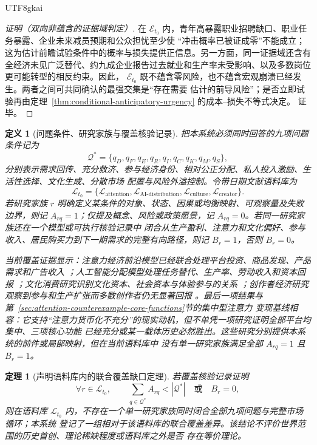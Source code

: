 \documentclass[12pt,a4paper,openany]{report}
\newtheorem{definition}{定义}[chapter]
\newtheorem{theorem}{定理}[chapter]
\begin{document}
\begin{CJK*}{UTF8}{gkai}
\begin{proof}[证明（双向非蕴含的证据域判定）]
在 \(\mathcal E_{t_0}\) 内，青年高暴露职业招聘缺口、职业任务暴露、企业未来减员预期和公众担忧至少使
“冲击概率已被证成零”不能成立；这为估计前瞻试验条件中的概率与损失提供正信息。另一方面，同一证据域还含有
全经济未见广泛替代、约九成企业报告过去就业和生产率未受影响、以及多数岗位更可能转型的相反约束。因此，
\(\mathcal E_{t_0}\) 既不蕴含零风险，也不蕴含宏观崩溃已经发生。两者之间可共同确认的最强交集是“存在需要
估计的前导风险”；是否立即试验再由定理~\ref{thm:conditional-anticipatory-urgency} 的成本--损失不等式决定。
证毕。
\end{proof}

\begin{definition}[问题条件、研究家族与覆盖核验记录]
\label{def:research-problem-gates}
把本系统必须同时回答的九项问题条件记为
\[
  \mathcal Q^*
  =\{q_D,q_F,q_E,q_R,q_I,q_C,q_K,q_M,q_S\},
\]
分别表示需求回传、充分救济、参与经济身份、相对公正分配、私人投入激励、生活性选择、文化生成、分散市场
配置与风险外溢控制。令带日期文献语料库为
\[
  \mathcal L_{t_0}
  =\{
  \mathcal L_{\mathrm{attention}},
  \mathcal L_{\mathrm{AI\text{-}distribution}},
  \mathcal L_{\mathrm{culture}},
  \mathcal L_{\mathrm{creator}}
  \}.
\]
若研究家族 \(r\) 明确定义某条件的对象、状态、因果或均衡映射、可观察量及失败边界，则记
\(A_{rq}=1\)；仅提及概念、风险或政策愿景，记 \(A_{rq}=0\)。若同一研究家族还在一个模型或可执行核验记录中
闭合从生产盈利、注意力和文化偏好、参与收入、居民购买力到下一期需求的完整有向路径，则记
\(B_r=1\)，否则 \(B_r=0\)。

当前覆盖证据显示：注意力经济前沿模型已经联合处理平台投资、商品发现、产品需求和广告收入
\cite{Chen2026Attention}；人工智能分配模型处理任务替代、生产率、劳动收入和资本回报
\cite{RockallTavaresPizzinelli2025}；文化消费研究识别文化资本、社会资本与体验参与的关系
\cite{GladstoneBellezza2025}；创作者经济研究观察到参与和生产扩张而多数创作者仍无显著回报
\cite{ZhangNegus2026}。最后一项结果与第~\ref{sec:attention-counterexample-core-functions}节的集中型注意力
变现基线相容：它支持“注意力货币化不充分”的现实动机，但不单凭一项研究证明全部平台均集中、三项核心功能
已经充分或某一载体历史必然胜出。这些研究分别提供本系统的前件或局部映射，但在当前语料库中
没有单一研究家族满足全部 \(A_{rq}=1\) 且 \(B_r=1\)。
\end{definition}

\begin{theorem}[声明语料库内的联合覆盖缺口定理]
\label{thm:declared-corpus-integrative-scarcity}
若覆盖核验记录证明
\[
  \forall r\in\mathcal L_{t_0},\qquad
  \sum_{q\in\mathcal Q^*}A_{rq}<|\mathcal Q^*|
  \quad\text{或}\quad B_r=0,
\]
则在语料库 \(\mathcal L_{t_0}\) 内，不存在一个单一研究家族同时闭合全部九项问题与完整市场循环；本系统
登记了一组相对于该语料库的联合覆盖差异。该结论不评价世界范围的历史首创、理论稀缺程度或语料库之外是否
存在等价理论。
\end{theorem}


\end{CJK*}
\end{document}
